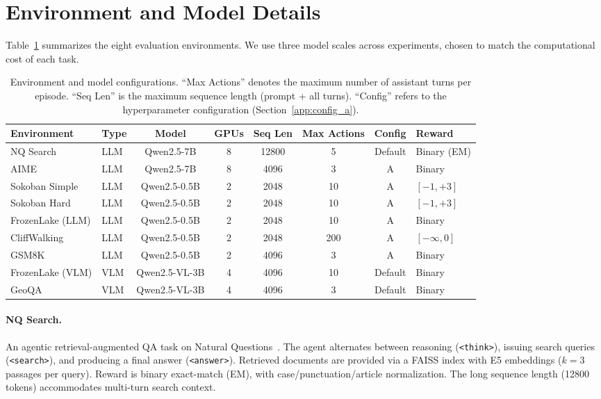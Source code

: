 \documentclass[runningheads]{llncs}
\begin{document}
\section{Environment and Model Details}
\label{app:env}

Table~\ref{tab:env_details} summarizes the eight evaluation environments. We use three model scales across experiments, chosen to match the computational cost of each task.

\begin{table}[ht]
\scriptsize
\caption{Environment and model configurations. ``Max Actions'' denotes the maximum number of assistant turns per episode. ``Seq Len'' is the maximum sequence length (prompt + all turns). ``Config'' refers to the hyperparameter configuration (Section~\ref{app:config_a}).}
\label{tab:env_details}
\begin{tabular}{llcccccl}
    \toprule
    \textbf{Environment} & \textbf{Type} & \textbf{Model} & \textbf{GPUs} & \textbf{Seq Len} & \textbf{Max Actions} & \textbf{Config} & \textbf{Reward} \\
    \midrule
    NQ Search & LLM & Qwen2.5-7B & 8 & 12800 & 5 & Default & Binary (EM) \\
    AIME & LLM & Qwen2.5-7B & 8 & 4096 & 3 & A & Binary \\
    Sokoban Simple & LLM & Qwen2.5-0.5B & 2 & 2048 & 10 & A & $[-1, +3]$ \\
    Sokoban Hard & LLM & Qwen2.5-0.5B & 2 & 2048 & 10 & A & $[-1, +3]$ \\
    FrozenLake (LLM) & LLM & Qwen2.5-0.5B & 2 & 2048 & 10 & A & Binary \\
    CliffWalking & LLM & Qwen2.5-0.5B & 2 & 2048 & 200 & A & $[-\infty, 0]$ \\
    GSM8K & LLM & Qwen2.5-0.5B & 2 & 4096 & 3 & A & Binary \\
    \midrule
    FrozenLake (VLM) & VLM & Qwen2.5-VL-3B & 4 & 4096 & 10 & Default & Binary \\
    GeoQA & VLM & Qwen2.5-VL-3B & 4 & 4096 & 3 & Default & Binary \\
    \bottomrule
\end{tabular}
\end{table}

\paragraph{NQ Search.}
An agentic retrieval-augmented QA task on Natural Questions~\cite{jin2025searchr1}. The agent alternates between reasoning (\texttt{<think>}), issuing search queries (\texttt{<search>}), and producing a final answer (\texttt{<answer>}). Retrieved documents are provided via a FAISS index with E5 embeddings ($k{=}3$ passages per query). Reward is binary exact-match (EM), with case/punctuation/article normalization. The long sequence length (12800 tokens) accommodates multi-turn search context.
\end{document}
